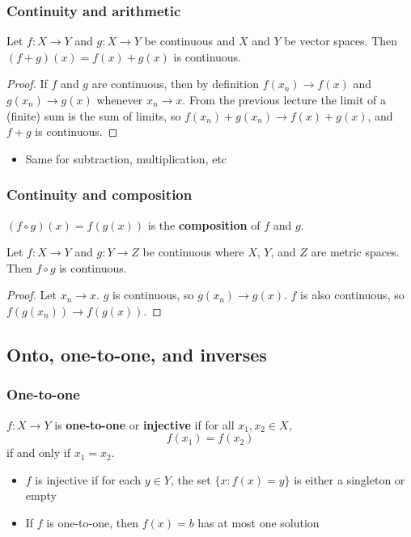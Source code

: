 \documentclass[compress]{beamer}
\renewcommand{\to}{{\rightarrow}}
\begin{document}
\begin{frame}
  \frametitle{Continuity and arithmetic}
  \begin{theorem}
    Let $f:X \to Y$ and $g:X \to Y$ be continuous and $X$ and $Y$ be
    vector spaces. Then $(f+g)(x) = f(x) + g(x)$ is continuous.
  \end{theorem}
  \begin{proof}
    If $f$ and $g$ are continuous, then by definition $f(x_n) \to f(x)$
    and $g(x_n) \to g(x)$ whenever $x_n \to x$. From the previous
    lecture the limit of a (finite) sum is the sum of limits, so 
    $f(x_n) + g(x_n) \to f(x) + g(x)$, and $f+g$ is continuous.
  \end{proof}
  \begin{itemize}
  \item Same for subtraction, multiplication, etc
  \end{itemize}
\end{frame}

\begin{frame}
  \frametitle{Continuity and composition}
  \begin{definition}
    $(f \circ g)(x) = f(g(x))$ is the \textbf{composition} of $f$ and $g$.
  \end{definition}
  \begin{theorem}
    Let $f:X \to Y$ and $g:Y \to Z$ be continuous where $X$, $Y$, and
    $Z$ are metric spaces. Then $f \circ g$ is continuous.
  \end{theorem}  
  \begin{proof}
    Let $x_n \to x$. $g$ is continuous, so $g(x_n) \to g(x)$. $f$ is
    also continuous, so $f(g(x_n)) \to f(g(x))$.
  \end{proof}
\end{frame}

\subsection{Onto, one-to-one, and inverses}

\begin{frame}
  \frametitle{One-to-one}
  \begin{definition}
    $f:X \to Y$ is \textbf{one-to-one} or \textbf{injective} if for all
    $x_1, x_2 \in X$, 
    \[ f(x_1) = f(x_2) \]
    if and only if $x_1 = x_2$.
  \end{definition}
  \begin{itemize}
  \item $f$ is injective if for each $y \in Y$, the set $\{x:
    f(x) = y\}$ is either a singleton or empty
  \item If $f$ is one-to-one, then $f(x) = b$ has at most one
    solution
  \end{itemize}
\end{frame}
\end{document}
